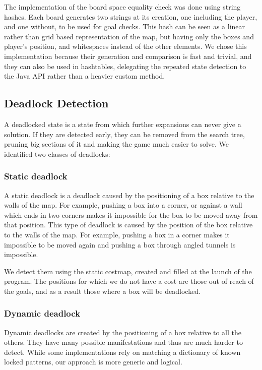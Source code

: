 \documentclass[a4paper,11pt]{article}
\begin{document}
The implementation of the board space equality check was done using string
hashes. Each board generates two strings at its creation, one including the
player, and one without, to be used for goal checks. This hash can be seen as a
linear rather than grid based representation of the map, but having only the
boxes and player's position, and whitespaces instead of the other elements. We
chose this implementation because their generation and comparison is fast and
trivial, and they can also be used in hashtables, delegating the repeated state
detection to the Java API rather than a heavier custom method.

\subsection{Deadlock Detection}

A deadlocked state is a state from which further expansions can never give a
solution. If they are detected early, they can be removed from the search tree,
pruning big sections of it and making the game much easier to solve. We 
identified two classes of deadlocks:

\subsubsection{Static deadlock}

A static deadlock is a deadlock caused by the positioning of a box relative to
the walls of the map. For example, pushing a box into a corner, or against a
wall which ends in two corners makes it impossible for the box to be moved away
from that position. This type of deadlock is caused by the position of the box
relative to the walls of the map. For example, pushing a box in a corner makes
it impossible to be moved again and pushing a box through angled tunnels is
impossible.

We detect them using the static costmap, created and filled at the launch of the
program. The positions for which we do not have a cost are those out of reach of
the goals, and as a result those where a box will be deadlocked.

\subsubsection{Dynamic deadlock}

Dynamic deadlocks are created by the positioning of a box relative to all the
others. They have many possible manifestations and thus are much harder to
detect. While some implementations rely on matching a dictionary of known locked
patterns, our approach is more generic and logical.
\end{document}
